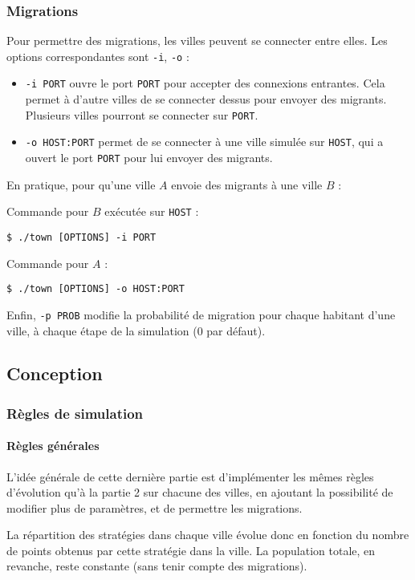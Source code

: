 \documentclass[10pt]{article}
\begin{document}
\subsubsection{Migrations}
Pour permettre des migrations, les villes peuvent se connecter entre elles.
Les options correspondantes sont \verb|-i|, \verb|-o| :
\begin{itemize}
\item \verb|-i PORT| ouvre le port \verb|PORT| pour accepter des connexions entrantes. 
      Cela permet à d'autre villes de se connecter dessus pour envoyer des migrants.
      Plusieurs villes pourront se connecter sur \verb|PORT|.
\item \verb|-o HOST:PORT| permet de se connecter à une ville simulée sur \verb|HOST|, qui
      a ouvert le port \verb|PORT| pour lui envoyer des migrants.
\end{itemize}

En pratique, pour qu'une ville $A$ envoie des migrants à une ville $B$ :

Commande pour $B$ exécutée sur \verb|HOST| :
\begin{verbatim}
$ ./town [OPTIONS] -i PORT
\end{verbatim}

Commande pour $A$ :
\begin{verbatim}
$ ./town [OPTIONS] -o HOST:PORT
\end{verbatim}

Enfin, \verb|-p PROB| modifie la probabilité de migration pour chaque habitant d'une ville,
à chaque étape de la simulation (0 par défaut).


\subsection{Conception}
\subsubsection{Règles de simulation}
\paragraph{Règles générales}
L'idée générale de cette dernière partie est d'implémenter les mêmes règles d'évolution qu'à la partie 2 sur chacune des villes,
en ajoutant la possibilité de modifier plus de paramètres, et de permettre les migrations.

La répartition des stratégies dans chaque ville évolue donc en fonction du nombre de points obtenus par cette stratégie dans la ville.
La population totale, en revanche, reste constante (sans tenir compte des migrations).
\end{document}
